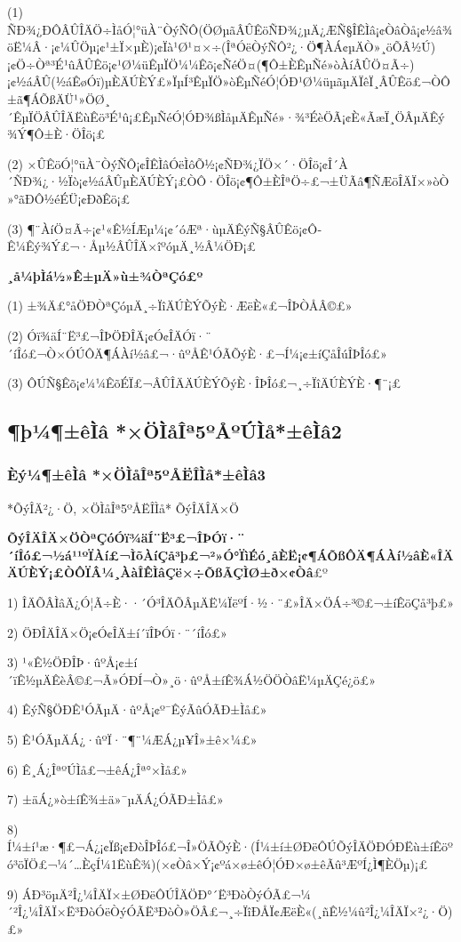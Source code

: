 \documentclass[10.5pt,compsoc]{CjC}
\theoremstyle{mystyle}
\begin{document}
\begin{CJK*}{GBK}{song}
(1) ÑÐ¾¿ÐÔÂÛÎÄÖ÷ÌåÓ¦°üÀ¨ÒýÑÔ(ÖØµãÂÛÊöÑÐ¾¿µÄ¿ÆÑ§ÎÊÌâ¡¢ÒâÒå¡¢½â¾öË¼Â·¡¢¼ÛÖµ¡¢¹±Ï×µÈ)¡¢Ïà¹Ø¹¤×÷(ÎªÓëÒýÑÔ²¿·Ö¶ÀÁ¢µÄÒ»¸öÕÂ½Ú)¡¢Ö÷Òª³É¹ûÂÛÊö¡¢¹Ø¼üÊµÏÖ¼¼Êõ¡¢ÑéÖ¤(¶Ô±ÈÊµÑé»òÀíÂÛÖ¤Ã÷)¡¢½áÂÛ(½áÊøÓï)µÈÄÚÈÝ£»ÏµÍ³ÊµÏÖ»òÊµÑéÓ¦ÓÐ¹Ø¼üµãµÄÏêÏ¸ÂÛÊö£¬ÒÔ±ã¶ÁÕßÄÜ¹»ÖØ¸´ÊµÏÖÂÛÎÄËùÊö³É¹û¡£ÊµÑéÓ¦ÓÐ¾ßÌåµÄÊµÑé»·¾³ÉèÖÃ¡¢È«ÃæÏ¸ÖÂµÄÊý¾Ý¶Ô±È·ÖÎö¡£

(2) ×ÛÊöÓ¦°üÀ¨ÒýÑÔ¡¢ÎÊÌâÓëÌôÕ½¡¢ÑÐ¾¿ÏÖ×´·ÖÎö¡¢Î´À´ÑÐ¾¿·½Ïò¡¢½áÂÛµÈÄÚÈÝ¡£ÒÔ·ÖÎö¡¢¶Ô±ÈÎªÖ÷£¬±ÜÃâ¶ÑÆöÎÄÏ×»òÒ»°ãÐÔ½éÉÜ¡¢ÐðÊö¡£

(3) ¶¨ÀíÖ¤Ã÷¡¢¹«Ê½ÍÆµ¼¡¢´óÆª·ùµÄÊýÑ§ÂÛÊö¡¢Ô­Ê¼Êý¾Ý£¬·Åµ½ÂÛÎÄ×îºóµÄ¸½Â¼ÖÐ¡£

{\bf ¸å¼þÌá½»Ê±µÄ»ù±¾ÒªÇó£º}

(1) ±¾Ä£°åÖÐÒªÇóµÄ¸÷ÏîÄÚÈÝÕýÈ·ÆëÈ«£¬ÎÞÒÅÂ©£»

(2) Óï¾äÍ¨Ë³£¬ÎÞÖÐÎÄ¡¢Ó¢ÎÄÓï·¨´íÎó£¬Ò×ÓÚÔÄ¶ÁÀí½â£¬·ûºÅÊ¹ÓÃÕýÈ·£¬Í¼¡¢±íÇåÎúÎÞÎó£»

(3) ÔÚÑ§Êõ¡¢¼¼ÊõÉÏ£¬ÂÛÎÄÄÚÈÝÕýÈ·ÎÞÎó£¬¸÷ÏîÄÚÈÝÈ·¶¨¡£

{\begin{CJK*}{GBK}{hei}\subsection{¶þ¼¶±êÌâ *×ÖÌåÎª5ºÅºÚÌå*±êÌâ2}\end{CJK*}}
\subsubsection{Èý¼¶±êÌâ *×ÖÌåÎª5ºÅËÎÌå*±êÌâ3}
*ÕýÎÄ²¿·Ö, ×ÖÌåÎª5ºÅËÎÌå* ÕýÎÄÎÄ×Ö

\textbf{ÕýÎÄÎÄ×ÖÒªÇóÓï¾äÍ¨Ë³£¬ÎÞÓï·¨´íÎó£¬½á¹¹ºÏÀí£¬ÌõÀíÇå³þ£¬²»Ó°ÏìÉó¸åÈË¡¢¶ÁÕßÔÄ¶ÁÀí½âÈ«ÎÄÄÚÈÝ¡£ÒÔÏÂ¼¸ÀàÎÊÌâÇë×÷ÕßÃÇÌØ±ð×¢Òâ}£º

1) ÎÄÕÂÌâÄ¿Ó¦Ã÷È··´Ó³ÎÄÕÂµÄË¼ÏëºÍ·½·¨£»ÎÄ×ÖÁ÷³©£¬±íÊöÇå³þ£»

2) ÖÐÎÄÎÄ×Ö¡¢Ó¢ÎÄ±í´ïÎÞÓï·¨´íÎó£»

3) ¹«Ê½ÖÐÎÞ·ûºÅ¡¢±í´ïÊ½µÄÊèÂ©£¬Ã»ÓÐÍ¬Ò»¸ö·ûºÅ±íÊ¾Á½ÖÖÒâË¼µÄÇé¿ö£»

4) ÊýÑ§ÖÐÊ¹ÓÃµÄ·ûºÅ¡¢º¯ÊýÃûÓÃÐ±Ìå£»

5) Ê¹ÓÃµÄÁ¿·ûºÏ·¨¶¨¼ÆÁ¿µ¥Î»±ê×¼£»

6) Ê¸Á¿ÎªºÚÌå£¬±êÁ¿Îª°×Ìå£»

7) ±äÁ¿»ò±íÊ¾±ä»¯µÄÁ¿ÓÃÐ±Ìå£»

8) Í¼±í¹æ·¶£¬Á¿¡¢Ïß¡¢ÐòÎÞÎó£¬Î»ÖÃÕýÈ·(Í¼±í±ØÐëÔÚÕýÎÄÖÐÓÐËù±íÊöºó³öÏÖ£¬¼´{\ldots}ÈçÍ¼1ËùÊ¾)(×¢Òâ×Ý¡¢ºá×ø±êÓ¦ÓÐ×ø±êÃû³ÆºÍ¿Ì¶ÈÖµ)¡£

9) ÁÐ³öµÄ²Î¿¼ÎÄÏ×±ØÐëÔÚÎÄÖÐ°´Ë³ÐòÒýÓÃ£¬¼´²Î¿¼ÎÄÏ×Ë³ÐòÓëÒýÓÃË³ÐòÒ»ÖÂ£¬¸÷ÏîÐÅÏ¢ÆëÈ«(¸ñÊ½¼û²Î¿¼ÎÄÏ×²¿·Ö)£»


\end{CJK*}
\end{document}
